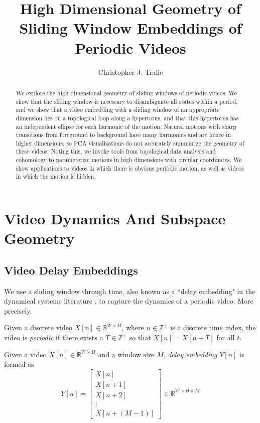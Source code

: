 \documentclass[a4paper,UKenglish]{lipics}
\title{High Dimensional Geometry of Sliding Window Embeddings of Periodic Videos}
\author[1]{Christopher J. Tralie}
\affil[1]{Department of Electrical and Computer Engineering, Duke University\\
  Durham, NC USA
  \texttt{chris.tralie@gmail.com}}
\begin{document}
\maketitle

\begin{abstract}
We explore the high dimensional geometry of sliding windows of periodic videos.  We show that the sliding window is necessary to disambiguate all states within a period, and we show that a video embedding with a sliding window of an appropriate dimension lies on a topological loop along a hypertorus, and that this hypertorus has an independent ellipse for each harmonic of the motion.  Natural motions with sharp transitions from foreground to background have many harmonics and are hence in higher dimensions, so PCA visualizations do not accurately summarize the geometry of these videos.  Noting this, we invoke tools from topological data analysis and cohomology to parameterize motions in high dimensions with circular coordinates.  We show applications to videos in which there is obvious periodic motion, as well as videos in which the motion is hidden.
\end{abstract}

\section{Video Dynamics And Subspace Geometry}




\subsection{Video Delay Embeddings}
We use a sliding window through time, also known as a ``delay embedding" in the dynamical systems literature \cite{kantz2004nonlinear}, to capture the dynamics of a periodic video.  More precisely, 

\begin{definition}
Given a discrete video $X[n] \in \mathbb{R}^{W \times H}$, where $n \in \mathbb{Z}^+$ is a discrete time index, the video is {\em periodic} if there exists a $T \in \mathbb{Z}^+$ so that $X[n] = X[n + T]$ for all $t$.
\end{definition}

\begin{definition}
Given a video $X[n] \in \mathbb{R}^{W \times H}$ and a window size $M$, {\em delay embedding} $Y[n]$ is formed as 
\begin{equation}
Y[n] = \left[ \begin{array}{c} X[n] \\ X[n + 1] \\ X[n+2] \\ \vdots \\ X[n + (M-1)] \end{array} \right] \in \mathbb{R}^{W \times H \times M}
\end{equation}
\end{definition}
\end{document}
